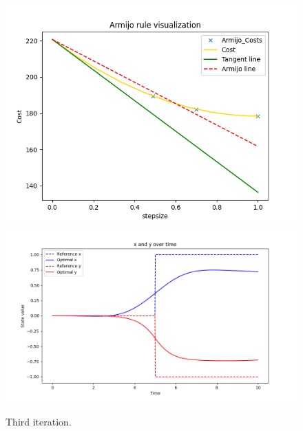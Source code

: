 \begin{figure}[H]
  \centering
  \includegraphics[width=1\textwidth]{pictures/arm_it_3.png}\hfill \\
  \includegraphics[width=1\textwidth]{pictures/new_it_3.png}\hfill
  \caption{Third iteration.}
  \label{fig:Reference trajectory}
\end{figure}

